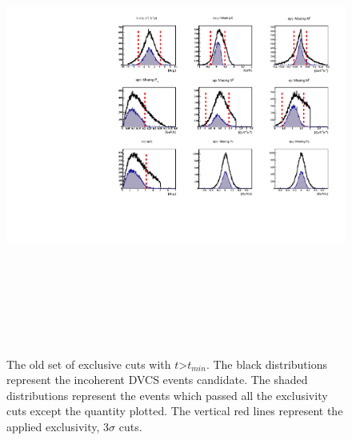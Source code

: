 \begin{figure}[h!]
\includegraphics[height=15.0cm]{fig-incoh/old_all_incoh_exc_cuts.pdf}
\caption{The old set of exclusive cuts with $t$>$t_{min}$. The black
   distributions represent the incoherent DVCS events candidate. The shaded
   distributions represent the events which passed all the exclusivity cuts
   except the quantity plotted. The vertical red lines represent the applied
exclusivity, 3$\sigma$ cuts.}
\label{fig:cuts_t}
\end{figure}

